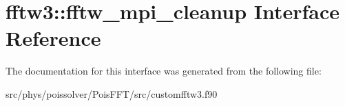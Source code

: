 \hypertarget{interfacefftw3_1_1fftw__mpi__cleanup}{}\section{fftw3\+:\+:fftw\+\_\+mpi\+\_\+cleanup Interface Reference}
\label{interfacefftw3_1_1fftw__mpi__cleanup}


The documentation for this interface was generated from the following file\+:\begin{DoxyCompactItemize}
\item 
src/phys/poissolver/\+Pois\+F\+F\+T/src/customfftw3.\+f90\end{DoxyCompactItemize}
